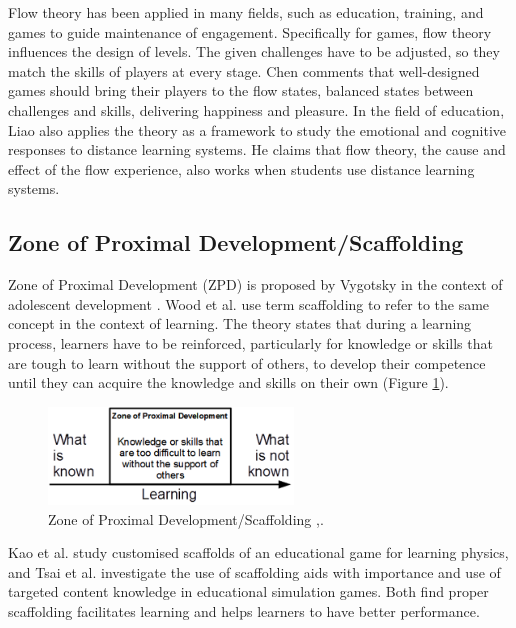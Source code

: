 \documentclass[12pt, a4paper]{report}
\begin{document}
Flow theory has been applied in many fields, such as education, training, and games to guide maintenance of engagement. Specifically for games, flow theory influences the design of levels. The given challenges have to be adjusted, so they match the skills of players at every stage. Chen \cite{chen2007flow} comments that well-designed games should bring their players to the flow states, balanced states between challenges and skills, delivering happiness and pleasure. In the field of education, Liao \cite{liao2006flow} also applies the theory as a framework to study the emotional and cognitive responses to distance learning systems. He claims that flow theory, the cause and effect of the flow experience, also works when students use distance learning systems.

\subsection{Zone of Proximal Development/Scaffolding}
Zone of Proximal Development (ZPD) is proposed by Vygotsky in the context of adolescent development \cite{vygotsky1978mind}. Wood et al. \cite{wood1976role} use term scaffolding to refer to the same concept in the context of learning. The theory states that during a learning process, learners have to be reinforced, particularly for knowledge or skills that are tough to learn without the support of others, to develop their competence until they can acquire the knowledge and skills on their own (Figure \ref{scaffolding}). 

\begin{figure}[ht]
\centering
\includegraphics[width=6.5cm]{scaffolding}
\caption{Zone of Proximal Development/Scaffolding \cite{vygotsky1978mind},\cite{wood1976role}.}
\label{scaffolding}
\end{figure}

Kao et al. \cite{kao2015designing} study customised scaffolds of an educational game for learning physics, and Tsai et al. \cite{tsai2013importance} investigate the use of scaffolding aids with importance and use of targeted content knowledge in educational simulation games. Both find proper scaffolding facilitates learning and helps learners to have better performance. 
\end{document}
